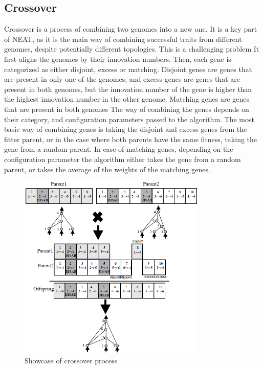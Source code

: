 \documentclass{article}
\begin{document}
\subsection{Crossover}
Crossover is a process of combining two genomes into a new one. It is a key part of NEAT, as it is the main way of combining successful traits from different
genomes, despite potentially different topologies.
This is a challenging problem \cite{Radcliffe} It first aligns the genomes by their innovation numbers.
Then, each gene is categorized as either disjoint, excess or matching.
Disjoint genes are genes that are present in only one of the genomes, and excess genes are genes that are present in both genomes, but the innovation number of
the gene is higher than the highest innovation number in the other genome. Matching genes are genes that are present in both genomes
The way of combining the genes depends on their category, and configuration parameters passed to the algorithm. The most basic way of combining genes
is taking the disjoint and excess genes from the fitter parent, or in the case where both parents have the same fitness, taking the gene from a random parent.
In case of matching genes, depending on the configuration parameter the algorithm either takes the gene from a random parent, or takes the average of the weights 
of the matching genes.
    \begin{figure}[h]
        \centering
        \includegraphics[width=0.8\textwidth]{crossover.png}
        \caption{Showcase of crossover process}
    \end{figure}
\end{document}
